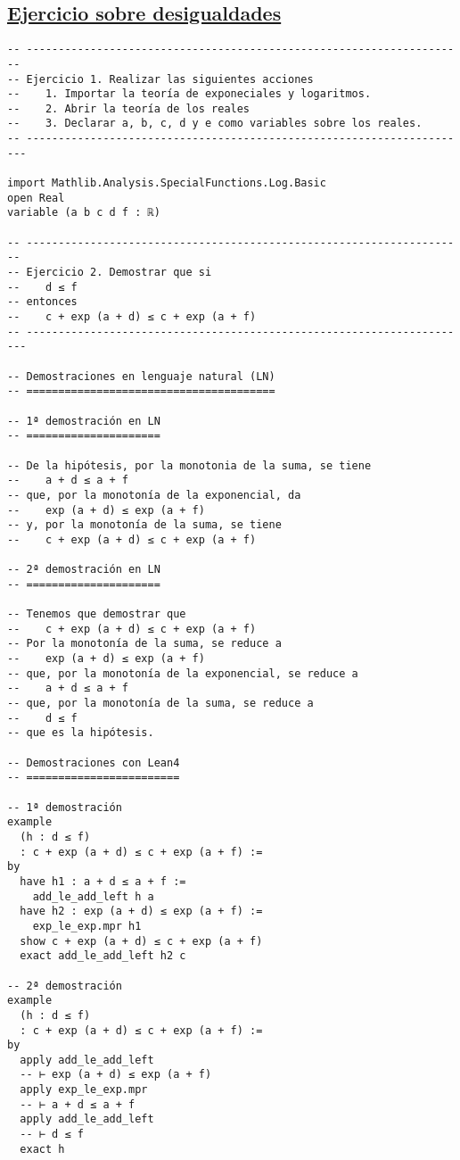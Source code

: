 \subsection{\href{./src/Basicos/Ejercicio\_sobre\_desigualdades.lean}{Ejercicio sobre desigualdades}}
\label{sec:org5c9c0da}
\begin{verbatim}
-- ---------------------------------------------------------------------
-- Ejercicio 1. Realizar las siguientes acciones
--    1. Importar la teoría de exponeciales y logaritmos.
--    2. Abrir la teoría de los reales
--    3. Declarar a, b, c, d y e como variables sobre los reales.
-- ----------------------------------------------------------------------

import Mathlib.Analysis.SpecialFunctions.Log.Basic
open Real
variable (a b c d f : ℝ)

-- ---------------------------------------------------------------------
-- Ejercicio 2. Demostrar que si
--    d ≤ f
-- entonces
--    c + exp (a + d) ≤ c + exp (a + f)
-- ----------------------------------------------------------------------

-- Demostraciones en lenguaje natural (LN)
-- =======================================

-- 1ª demostración en LN
-- =====================

-- De la hipótesis, por la monotonia de la suma, se tiene
--    a + d ≤ a + f
-- que, por la monotonía de la exponencial, da
--    exp (a + d) ≤ exp (a + f)
-- y, por la monotonía de la suma, se tiene
--    c + exp (a + d) ≤ c + exp (a + f)

-- 2ª demostración en LN
-- =====================

-- Tenemos que demostrar que
--    c + exp (a + d) ≤ c + exp (a + f)
-- Por la monotonía de la suma, se reduce a
--    exp (a + d) ≤ exp (a + f)
-- que, por la monotonía de la exponencial, se reduce a
--    a + d ≤ a + f
-- que, por la monotonía de la suma, se reduce a
--    d ≤ f
-- que es la hipótesis.

-- Demostraciones con Lean4
-- ========================

-- 1ª demostración
example
  (h : d ≤ f)
  : c + exp (a + d) ≤ c + exp (a + f) :=
by
  have h1 : a + d ≤ a + f :=
    add_le_add_left h a
  have h2 : exp (a + d) ≤ exp (a + f) :=
    exp_le_exp.mpr h1
  show c + exp (a + d) ≤ c + exp (a + f)
  exact add_le_add_left h2 c

-- 2ª demostración
example
  (h : d ≤ f)
  : c + exp (a + d) ≤ c + exp (a + f) :=
by
  apply add_le_add_left
  -- ⊢ exp (a + d) ≤ exp (a + f)
  apply exp_le_exp.mpr
  -- ⊢ a + d ≤ a + f
  apply add_le_add_left
  -- ⊢ d ≤ f
  exact h


\end{verbatim}
